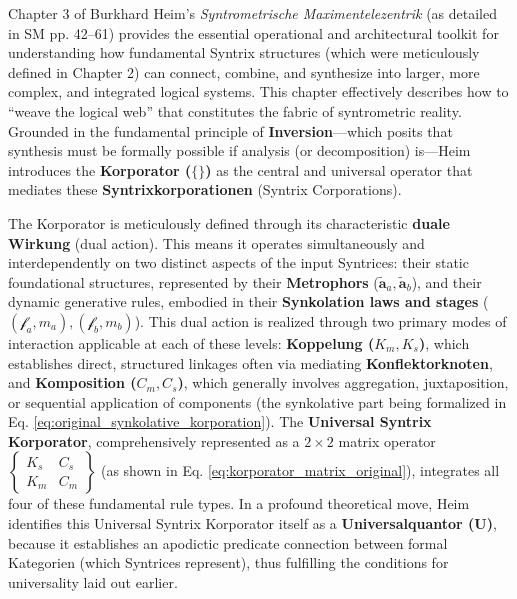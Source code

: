 \documentclass[12pt]{article}
\newcommand{\q}[1]{\enquote{#1}}
\newcommand{\metrophor}{\bm{\widetilde{a}}}
\newcommand{\synkolator}{\mathcal{f}}
\newcommand{\synkolationsstufe}{m}
\newcommand{\universalquantor}{\bm{U}}
\newcommand{\korporatoroperator}{\begin{Bmatrix} K_s & C_s \\ K_m & C_m \end{Bmatrix}}
\begin{document}
Chapter 3 of Burkhard Heim's \textit{Syntrometrische Maximentelezentrik} (as detailed in SM pp. 42–61) provides the essential operational and architectural toolkit for understanding how fundamental Syntrix structures (which were meticulously defined in Chapter 2) can connect, combine, and synthesize into larger, more complex, and integrated logical systems. This chapter effectively describes how to \q{weave the logical web} that constitutes the fabric of syntrometric reality. Grounded in the fundamental principle of \textbf{Inversion}—which posits that synthesis must be formally possible if analysis (or decomposition) is—Heim introduces the \textbf{Korporator (\( \{ \} \))} as the central and universal operator that mediates these \textbf{Syntrixkorporationen} (Syntrix Corporations).

The Korporator is meticulously defined through its characteristic \textbf{duale Wirkung} (dual action). This means it operates simultaneously and interdependently on two distinct aspects of the input Syntrices: their static foundational structures, represented by their \textbf{Metrophors} (\(\metrophor_a, \metrophor_b\)), and their dynamic generative rules, embodied in their \textbf{Synkolation laws and stages} (\( (\synkolator_a,\synkolationsstufe_a), (\synkolator_b,\synkolationsstufe_b) \)). This dual action is realized through two primary modes of interaction applicable at each of these levels: \textbf{Koppelung (\( K_m, K_s \))}, which establishes direct, structured linkages often via mediating \textbf{Konflektorknoten}, and \textbf{Komposition (\( C_m, C_s \))}, which generally involves aggregation, juxtaposition, or sequential application of components (the synkolative part being formalized in Eq. \eqref{eq:original_synkolative_korporation}). The \textbf{Universal Syntrix Korporator}, comprehensively represented as a \( 2 \times 2 \) matrix operator \( \korporatoroperator \) (as shown in Eq. \eqref{eq:korporator_matrix_original}), integrates all four of these fundamental rule types. In a profound theoretical move, Heim identifies this Universal Syntrix Korporator itself as a \textbf{Universalquantor (\(\universalquantor\))}, because it establishes an apodictic predicate connection between formal Kategorien (which Syntrices represent), thus fulfilling the conditions for universality laid out earlier.
\end{document}
